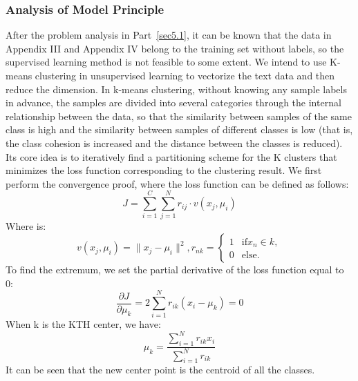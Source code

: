 \documentclass[12pt]{mcmthesis}
\begin{document}
\subsubsection{Analysis of Model Principle}
After the problem analysis in Part~\ref{sec5.1}, it can be known that the data in Appendix III and Appendix IV belong to the training set without labels, so the supervised learning method is not feasible to some extent. We intend to use K-means clustering in unsupervised learning to vectorize the text data and then reduce the dimension. In k-means clustering, without knowing any sample labels in advance, the samples are divided into several categories through the internal relationship between the data, so that the similarity between samples of the same class is high and the similarity between samples of different classes is low (that is, the class cohesion is increased and the distance between the classes is reduced). Its core idea is to iteratively find a partitioning scheme for the K clusters that minimizes the loss function corresponding to the clustering result\cite{4}. We first perform the convergence proof, where the loss function can be defined as follows:
\begin{equation}
	J=\sum_{i=1}^{C}\sum_{j=1}^{N}r_{ij}\cdot v(x_j,\mu_i)
\end{equation}
Where is:
\begin{equation}
	v(x_j,\mu_i)=\parallel x_j-\mu_i\parallel^2,r_{nk}=
	\begin{cases}
		1 & \text{if} x_n\in k,\\
		0 & \text{else.}
	\end{cases}
\end{equation}
To find the extremum, we set the partial derivative of the loss function equal to 0:
\begin{equation}
	\frac{\partial J}{\partial \mu_k}=2\sum_{i=1}^{N}r_{ik}(x_i-\mu_k)=0
\end{equation}
When k is the KTH center, we have:
\begin{equation}
	\mu_k=\frac{\sum_{i=1}^{N}r_{ik} x_i}{\sum_{i=1}^{N}r_{ik}}
\end{equation}
It can be seen that the new center point is the centroid of all the classes.
\end{document}

